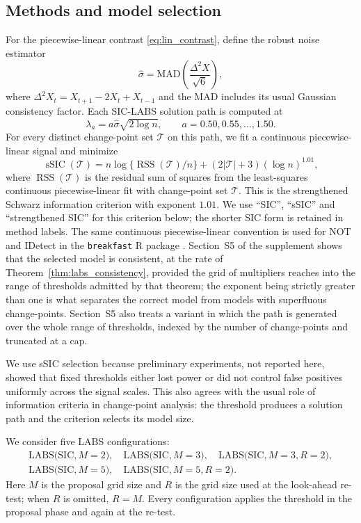 \documentclass[12pt, a4paper]{article}
\begin{document}
\subsection{Methods and model selection}
\label{sec:mms}

For the piecewise-linear contrast \eqref{eq:lin_contrast}, define the robust
noise estimator
\[
    \hat{\sigma} =
    \mathrm{MAD}\left(\frac{\Delta^2 X}{\sqrt{6}}\right),
\]
where $\Delta^2 X_t=X_{t+1}-2X_t+X_{t-1}$ and the MAD includes its usual
Gaussian consistency factor.  Each SIC-LABS solution path is computed at
\[
    \lambda_a = a\hat{\sigma}\sqrt{2\log n},
    \qquad a=0.50,0.55,\ldots,1.50.
\]
For every distinct change-point set $\mathcal{T}$ on this path, we fit a
continuous piecewise-linear signal and minimize
\[
    \operatorname{sSIC}(\mathcal{T})
    =n\log\{\operatorname{RSS}(\mathcal{T})/n\}
     +(2|\mathcal{T}|+3)(\log n)^{1.01},
\]
where $\operatorname{RSS}(\mathcal{T})$ is the residual sum of squares from the
least-squares continuous piecewise-linear fit with change-point set
$\mathcal{T}$.  This is the strengthened Schwarz information criterion with
exponent $1.01$.  We use ``SIC'', ``sSIC'' and ``strengthened SIC'' for this
criterion below; the shorter SIC form is retained in method labels.  The same
continuous piecewise-linear convention is used for NOT and IDetect in the
\texttt{breakfast} R package \citep{breakfast}.  Section~S5 of the supplement shows that the selected model is
consistent, at the rate of Theorem~\ref{thm:labs_consistency}, provided the
grid of multipliers reaches into the range of thresholds admitted by that
theorem; the exponent being strictly greater than one is what separates the
correct model from models with superfluous change-points.  
Section~S5 also treats a variant in which the path is generated over the whole
range of thresholds, indexed by the number of change-points and truncated at a
cap.

We use sSIC selection because preliminary experiments, not reported here,
showed that fixed thresholds either lost power or did not control false
positives uniformly across the signal scales.  This also agrees with the usual
role of information criteria in change-point analysis: the threshold produces a
solution path and the criterion selects its model size.

We consider five LABS configurations:
\[
\begin{gathered}
\mathrm{LABS(SIC,}M=2),\quad
\mathrm{LABS(SIC,}M=3),\quad
\mathrm{LABS(SIC,}M=3,R=2),\\
\mathrm{LABS(SIC,}M=5),\quad
\mathrm{LABS(SIC,}M=5,R=2).
\end{gathered}
\]
Here $M$ is the proposal grid size and $R$ is the grid size used at the
look-ahead re-test; when $R$ is omitted, $R=M$.  Every configuration applies
the threshold in the proposal phase and again at the re-test.
\end{document}
